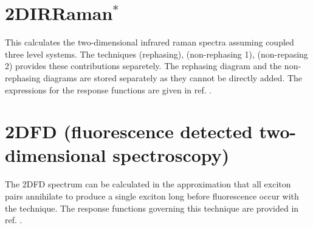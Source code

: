 \section{2DIRRaman$^{*}$}
This calculates the two-dimensional infrared raman spectra assuming coupled three
level systems. The techniques  (rephasing), 
(non-rephasing 1),  (non-repasing 2) provides these contributions
separetely. The rephasing diagram and the non-rephasing diagrams are stored separately
as they cannot be directly added. The expressions for the response functions are given
in ref. \cite{vanHengel.2023.J.Chem.Phys..158.064106}.

\section{2DFD (fluorescence detected two-dimensional spectroscopy)}
 The 2DFD spectrum can be calculated in the approximation that all exciton pairs
 annihilate to produce a single exciton long before fluorescence occur with the
  technique. The response functions governing this technique are
 provided in ref. \cite{Kunsel_2018}.
